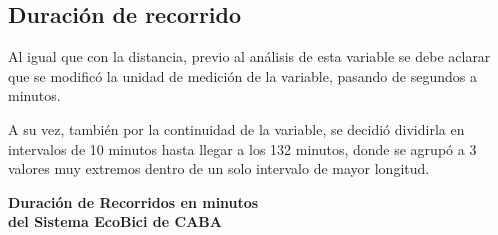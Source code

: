 \documentclass[11pt]{article}
\begin{document}
      \subsection{Duraci\'on de recorrido}

      Al igual que con la distancia, previo al an\'alisis de esta variable se debe aclarar
      que se modific\'o la unidad de medici\'on de la variable, pasando de segundos a minutos. 

      A su vez, tambi\'en por la continuidad de la variable, se decidi\'o dividirla en intervalos de 
      10 minutos hasta llegar a los 132 minutos, donde se agrup\'o a 3 valores muy extremos dentro de un solo intervalo de mayor longitud. 

      \vspace{7mm}

      \begin{center}
        \large\textbf{Duraci\'on de Recorridos en minutos \\ del Sistema EcoBici de CABA}
      \end{center}
\end{document}
